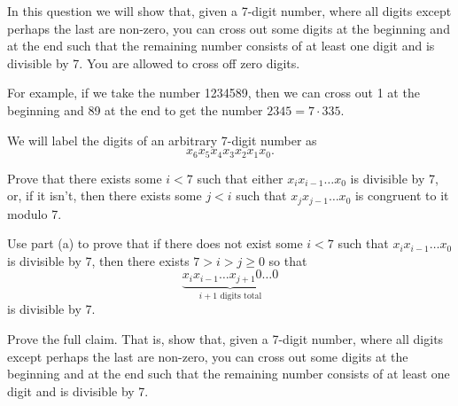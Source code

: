 \documentclass[12pt]{exam}
\begin{document}
In this question we will show that, given a 7-digit number, where all digits except perhaps the last are non-zero, you can cross out some digits at the beginning and at the end such that the remaining number consists of at least one digit and is divisible by 7. You are allowed to cross off zero digits.

For example, if we take the number 1234589, then we can cross out 1 at the beginning and 89 at the end to get the number $2345 = 7 \cdot 335$.

We will label the digits of an arbitrary 7-digit number as $$x_6 x_5 x_4 x_3 x_2 x_1 x_0.$$
\begin{qparts}
    \item Prove that there exists some $i < 7$ such that either $x_i x_{i-1} \dots x_0$ is divisible by 7,
    or, if it isn't, then there exists some $j < i$ such that $x_j x_{j-1} \dots x_0$ is congruent to it
    modulo 7.
    \item Use part (a) to prove that if there does not exist some $i < 7$ such that $x_i x_{i-1} \dots x_0$ is divisible by 7, then there exists $7 > i > j \geq 0$ so that $$\underbrace{x_ix_{i-1}\dots x_{j+1} 0 \dots 0}_{i + 1 \text{ digits total}}$$ is divisible by 7.
    \item Prove the full claim. That is, show that, given a 7-digit number, where all digits except perhaps the last are non-zero, you can cross out some digits at the beginning and at the end such that the remaining number consists of at least one digit and is divisible by 7.
\end{qparts}
\end{document}
